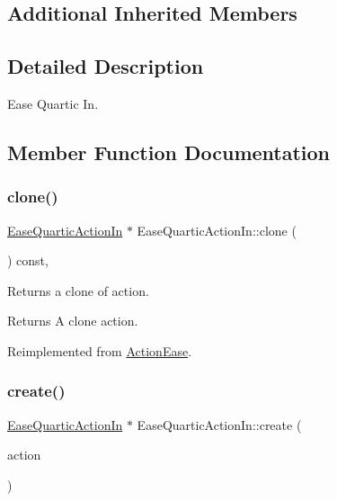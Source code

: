 \subsection*{Additional Inherited Members}


\subsection{Detailed Description}
Ease Quartic In. 

\subsection{Member Function Documentation}
\mbox{\label{classEaseQuarticActionIn_a8b5a6564a7eb7284fc165aeb2b465986}} 
\subsubsection{\texorpdfstring{clone()}{clone()}}
{\footnotesize\ttfamily \hyperlink{classEaseQuarticActionIn}{Ease\+Quartic\+Action\+In} $\ast$ Ease\+Quartic\+Action\+In\+::clone (\begin{DoxyParamCaption}\item[{void}]{ }\end{DoxyParamCaption}) const\hspace{0.3cm}{\ttfamily [override]}, {\ttfamily [virtual]}}

Returns a clone of action.

\begin{DoxyReturn}{Returns}
A clone action. 
\end{DoxyReturn}


Reimplemented from \hyperlink{classActionEase_a39bec93fe161fb732a74d8e51a2fe08b}{Action\+Ease}.

\mbox{\label{classEaseQuarticActionIn_ad4bad3b0bfd638fae2c0cdfb986e4c30}} 
\subsubsection{\texorpdfstring{create()}{create()}}
{\footnotesize\ttfamily \hyperlink{classEaseQuarticActionIn}{Ease\+Quartic\+Action\+In} $\ast$ Ease\+Quartic\+Action\+In\+::create (\begin{DoxyParamCaption}\item[{\hyperlink{classActionInterval}{Action\+Interval} $\ast$}]{action }\end{DoxyParamCaption})\hspace{0.3cm}{\ttfamily [static]}}



